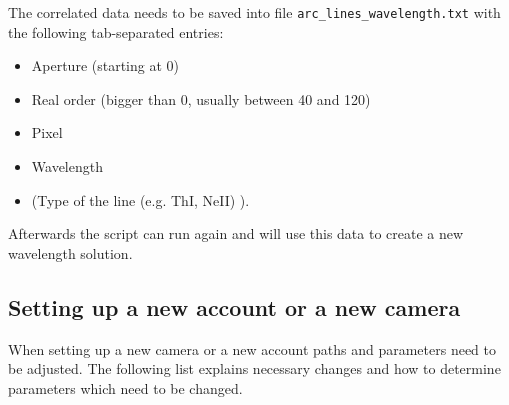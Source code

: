 \documentclass[10pt,a4paper]{article}
\begin{document}
The correlated data needs to be saved into file \verb|arc_lines_wavelength.txt| with the following tab-separated entries:
\begin{itemize}
  \item Aperture (starting at 0)
  \item Real order (bigger than 0, usually between 40 and 120)
  \item Pixel
  \item Wavelength
  \item (Type of the line (e.g. ThI, NeII) ).
\end{itemize}

Afterwards the script can run again and will use this data to create a new wavelength solution.


\subsection{Setting up a new account or a new camera}
When setting up a new camera or a new account paths and parameters need to be adjusted. The following list explains necessary changes and how to determine parameters which need to be changed.
\end{document}
